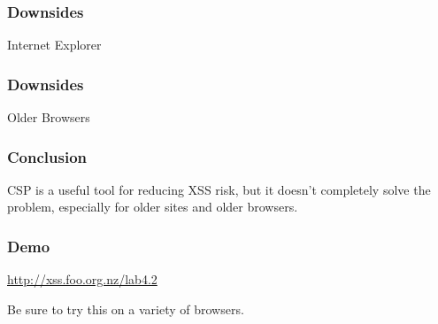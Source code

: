 \documentclass[10pt]{beamer}
\begin{document}
\begin{frame}[fragile]
	\frametitle{Downsides}
	
	
	Internet Explorer
	
	
\end{frame}

\begin{frame}[fragile]
	\frametitle{Downsides}
	
	
	Older Browsers
	
	
\end{frame}

\begin{frame}[fragile]
	\frametitle{Conclusion}
	
	
	CSP is a useful tool for reducing XSS risk, but it doesn't completely solve the problem, especially for older sites and older browsers.
	
	
\end{frame}

\begin{frame}[fragile]
	\frametitle{Demo}
	
	
    \url{http://xss.foo.org.nz/lab4.2}
    
    \vspace{10mm}
    Be sure to try this on a variety of browsers.
	
	
\end{frame}
\end{document}
